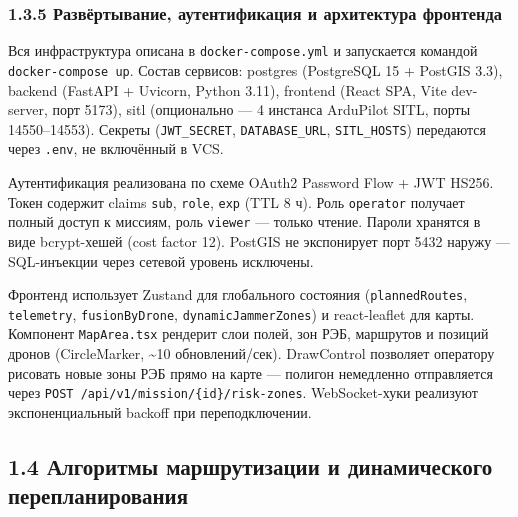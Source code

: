 \documentclass[14pt,a4paper]{extarticle}
\begin{document}
\hypertarget{ux440ux430ux437ux432ux451ux440ux442ux44bux432ux430ux43dux438ux435-ux430ux443ux442ux435ux43dux442ux438ux444ux438ux43aux430ux446ux438ux44f-ux438-ux430ux440ux445ux438ux442ux435ux43aux442ux443ux440ux430-ux444ux440ux43eux43dux442ux435ux43dux434ux430}{%
\subsubsection{1.3.5 Развёртывание, аутентификация и архитектура фронтенда}\label{ux440ux430ux437ux432ux451ux440ux442ux44bux432ux430ux43dux438ux435-ux430ux443ux442ux435ux43dux442ux438ux444ux438ux43aux430ux446ux438ux44f-ux438-ux430ux440ux445ux438ux442ux435ux43aux442ux443ux440ux430-ux444ux440ux43eux43dux442ux435ux43dux434ux430}}

Вся инфраструктура описана в \texttt{docker-compose.yml} и запускается командой \texttt{docker-compose\ up}. Состав сервисов: postgres (PostgreSQL 15 + PostGIS 3.3), backend (FastAPI + Uvicorn, Python 3.11), frontend (React SPA, Vite dev-server, порт 5173), sitl (опционально --- 4 инстанса ArduPilot SITL, порты 14550--14553). Секреты (\texttt{JWT\_SECRET}, \texttt{DATABASE\_URL}, \texttt{SITL\_HOSTS}) передаются через \texttt{.env}, не включённый в VCS.

Аутентификация реализована по схеме OAuth2 Password Flow + JWT HS256. Токен содержит claims \texttt{sub}, \texttt{role}, \texttt{exp} (TTL 8 ч). Роль \texttt{operator} получает полный доступ к миссиям, роль \texttt{viewer} --- только чтение. Пароли хранятся в виде bcrypt-хешей (cost factor 12). PostGIS не экспонирует порт 5432 наружу --- SQL-инъекции через сетевой уровень исключены.

Фронтенд использует Zustand для глобального состояния (\texttt{plannedRoutes}, \texttt{telemetry}, \texttt{fusionByDrone}, \texttt{dynamicJammerZones}) и react-leaflet для карты. Компонент \texttt{MapArea.tsx} рендерит слои полей, зон РЭБ, маршрутов и позиций дронов (CircleMarker, \textasciitilde10 обновлений/сек). DrawControl позволяет оператору рисовать новые зоны РЭБ прямо на карте --- полигон немедленно отправляется через \texttt{POST\ /api/v1/mission/\{id\}/risk-zones}. WebSocket-хуки реализуют экспоненциальный backoff при переподключении.


\hypertarget{ux430ux43bux433ux43eux440ux438ux442ux43cux44b-ux43cux430ux440ux448ux440ux443ux442ux438ux437ux430ux446ux438ux438-ux438-ux434ux438ux43dux430ux43cux438ux447ux435ux441ux43aux43eux433ux43e-ux43fux435ux440ux435ux43fux43bux430ux43dux438ux440ux43eux432ux430ux43dux438ux44f}{%
\subsection{1.4 Алгоритмы маршрутизации и динамического перепланирования}\label{ux430ux43bux433ux43eux440ux438ux442ux43cux44b-ux43cux430ux440ux448ux440ux443ux442ux438ux437ux430ux446ux438ux438-ux438-ux434ux438ux43dux430ux43cux438ux447ux435ux441ux43aux43eux433ux43e-ux43fux435ux440ux435ux43fux43bux430ux43dux438ux440ux43eux432ux430ux43dux438ux44f}}
\end{document}
